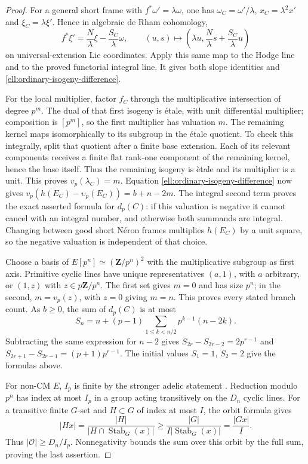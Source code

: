 \begin{proof}
For a general short frame with $f^*\omega'=\lambda\omega$, one has
$\omega_C=\omega'/\lambda$, $x_C=\lambda^2x'$ and
$\xi_C=\lambda\xi'$. Hence in algebraic de Rham cohomology,
\[
 f^*\xi'=\frac N\lambda\xi-\frac{S_C}{\lambda}\omega,
 \qquad
 (u,s)\longmapsto
 \left(\lambda u,\frac N\lambda s+\frac{S_C}{\lambda}u\right)
\]
on universal-extension Lie coordinates. Apply this same map to the
Hodge line and to the proved functorial integral line. It gives both
slope identities and \eqref{ell:ordinary-isogeny-difference}.

For the local multiplier, factor $f_C$ through the multiplicative
intersection of degree $p^m$. The dual of that first isogeny is
\'etale, with unit differential multiplier; composition is $[p^m]$,
so the first multiplier has valuation $m$.
The remaining kernel maps isomorphically to its subgroup in the
\'etale quotient. To check this integrally, split that quotient after
a finite base extension. Each of its relevant components receives a
finite flat rank-one component of the remaining kernel, hence the
base itself. Thus the remaining isogeny is \`etale and its multiplier
is a unit. This proves $v_p(\lambda_C)=m$.
Equation \eqref{ell:ordinary-isogeny-difference} now gives
$v_p(h(E_C)-\upsilon_p(E_C))=b+n-2m$.
The integral second term proves the exact asserted formula for
$d_p(C)$: if this valuation is negative it cannot cancel with an
integral number, and otherwise both summands are integral.
Changing between good short N\'eron frames multiplies $h(E_C)$ by a
unit square, so the negative valuation is independent of that choice.

Choose a basis of $E[p^n]\simeq(\mathbf Z/p^n)^2$ with the
multiplicative subgroup as first axis. Primitive cyclic lines have
unique representatives $(a,1)$, with $a$ arbitrary, or $(1,z)$ with
$z\in p\mathbf Z/p^n$. The first set gives $m=0$ and has size $p^n$;
in the second, $m=v_p(z)$, with $z=0$ giving $m=n$.
This proves every stated branch count. As $b\ge0$, the sum of
$d_p(C)$ is at most
\[
 S_n=n+(p-1)\sum_{1\le k<n/2}p^{k-1}(n-2k).
\]
Subtracting the same expression for $n-2$ gives
$S_{2r}-S_{2r-2}=2p^{r-1}$ and
$S_{2r+1}-S_{2r-1}=(p+1)p^{r-1}$.
The initial values $S_1=1$, $S_2=2$ give the formulas above.

For non-CM $E$, $I_p$ is finite by the stronger adelic statement
\cite[Corollary 9.3, p.2393; restated p.2348]{EllLombardo2015OpenImage}.
Reduction modulo $p^n$ has index at most $I_p$ in a group acting
transitively on the $D_n$ cyclic lines. For a transitive finite
$G$-set and $H\subset G$ of index at most $I$, the orbit formula gives
\[
 |Hx|=\frac{|H|}{|H\cap\operatorname{Stab}_G(x)|}
 \ge\frac{|G|}{I|\operatorname{Stab}_G(x)|}=\frac{|Gx|}{I}.
\]
Thus $|\mathcal O|\ge D_n/I_p$. Nonnegativity bounds the sum over
this orbit by the full sum, proving the last assertion.
\end{proof}


